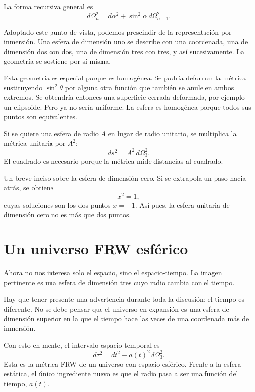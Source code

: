 La forma recursiva general es
\begin{equation}
d\Omega_n^2=d\alpha^2+\sin^2\alpha\,d\Omega_{n-1}^2.
\end{equation}

Adoptado este punto de vista, podemos prescindir de la representación por inmersión. Una esfera de dimensión uno se describe con una coordenada, una de dimensión dos con dos, una de dimensión tres con tres, y así sucesivamente. La geometría se sostiene por sí misma.

Esta geometría es especial porque es homogénea. Se podría deformar la métrica sustituyendo \(\sin^2\theta\) por alguna otra función que también se anule en ambos extremos. Se obtendría entonces una superficie cerrada deformada, por ejemplo un elipsoide. Pero ya no sería uniforme. La esfera es homogénea porque todos sus puntos son equivalentes.

Si se quiere una esfera de radio \(A\) en lugar de radio unitario, se multiplica la métrica unitaria por \(A^2\):
\begin{equation}
ds^2=A^2\,d\Omega_3^2.
\end{equation}
El cuadrado es necesario porque la métrica mide distancias al cuadrado.

Un breve inciso sobre la esfera de dimensión cero. Si se extrapola un paso hacia atrás, se obtiene
\begin{equation}
x^2=1,
\end{equation}
cuyas soluciones son los dos puntos \(x=\pm 1\). Así pues, la esfera unitaria de dimensión cero no es más que dos puntos.

\section{Un universo FRW esférico}

Ahora no nos interesa solo el espacio, sino el espacio-tiempo. La imagen pertinente es una esfera de dimensión tres cuyo radio cambia con el tiempo.

Hay que tener presente una advertencia durante toda la discusión: el tiempo es diferente. No se debe pensar que el universo en expansión es una esfera de dimensión superior en la que el tiempo hace las veces de una coordenada más de inmersión.

Con esto en mente, el intervalo espacio-temporal es
\begin{equation}
d\tau^2=dt^2-a(t)^2\,d\Omega_3^2.
\end{equation}
Esta es la métrica FRW de un universo con espacio esférico. Frente a la esfera estática, el único ingrediente nuevo es que el radio pasa a ser una función del tiempo, \(a(t)\).

